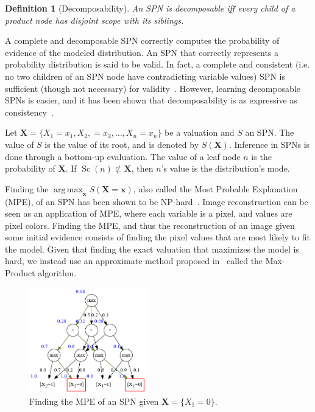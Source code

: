 \documentclass{article}
\newtheorem{definition}{Definition}
\DeclareMathOperator*{\argmax}{arg\,max}
\DeclareMathOperator*{\Sc}{\text{Sc}}
\begin{document}
\begin{definition}[Decomposability]
  An SPN is decomposable iff every child of a product node has disjoint scope with its siblings.
\end{definition}

A complete and decomposable SPN correctly computes the probability of evidence of the modeled
distribution. An SPN that correctly represents a probability distribution is said to be valid. In
fact, a complete and consistent (i.e. no two children of an SPN node have contradicting variable
values) SPN is sufficient (though not necessary) for validity~\cite{poon11}. However,
learning decomposable SPNs is easier, and it has been shown that decomposability is as expressive
as consistency~\cite{peharz15}.

Let $\mathbf{X}=\{X_1=x_1,X_2,=x_2,\ldots,X_n=x_n\}$ be a valuation and $S$ an SPN. The value of
$S$ is the value of its root, and is denoted by $S(\mathbf{X})$. Inference in SPNs is done through
a bottom-up evaluation. The value of a leaf node $n$ is the probability of $\mathbf{X}$. If
$\Sc(n)\not\subset\mathbf{X}$, then $n$'s value is the distribution's mode.

Finding the $\argmax_{\mathbf{x}} S(\mathbf{X}=\mathbf{x})$, also called the Most Probable
Explanation (MPE), of an SPN has been shown to be NP-hard~\cite{peharz15,mei18,conaty17}. Image
reconstruction can be seen as an application of MPE, where each variable is a pixel, and values are
pixel colors. Finding the MPE, and thus the reconstruction of an image given some initial evidence
consists of finding the pixel values that are most likely to fit the model. Given that finding the
exact valuation that maximizes the model is hard, we instead use an approximate method proposed
in~\cite{poon11} called the Max-Product algorithm.

\begin{figure}[t]
  \centering\centerline{\includegraphics[width=0.45\textwidth]{imgs/sample_mpn_prob.png}}
  \caption{Finding the MPE of an SPN given $\mathbf{X}=\{X_1=0\}$.\label{fig:mpn}}
\end{figure}
\end{document}
